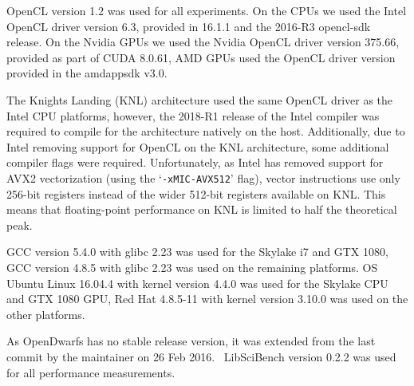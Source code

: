 \documentclass[../document.tex]{subfiles}
\begin{document}
\label{ssec:software}

OpenCL version 1.2 was used for all experiments.
On the CPUs we used the Intel OpenCL driver version 6.3, provided in 16.1.1 and the 2016-R3 opencl-sdk release.
On the Nvidia GPUs we used the Nvidia OpenCL driver version 375.66, provided as part of CUDA 8.0.61, AMD GPUs used the OpenCL driver version provided in the amdappsdk v3.0.

The Knights Landing (KNL) architecture used the same OpenCL driver as the Intel CPU platforms, however, the 2018-R1 release of the Intel compiler was required to compile for the architecture natively on the host.
Additionally, due to Intel removing support for OpenCL on the KNL architecture, some additional compiler flags were required.
Unfortunately, as Intel has removed support for AVX2 vectorization (using the `{\tt -xMIC-AVX512}' flag), vector instructions use only 256-bit registers instead of the wider 512-bit registers available on KNL.
This means that floating-point performance on KNL is limited to half the theoretical peak.

GCC version 5.4.0 with glibc 2.23 was used for the Skylake i7 and GTX 1080,  
GCC version 4.8.5 with glibc 2.23 was used on the remaining platforms.
OS Ubuntu Linux 16.04.4 with kernel version 4.4.0 was used for the Skylake CPU and GTX 1080 GPU, Red Hat 4.8.5-11 with kernel version 3.10.0 was used on the other platforms.

As OpenDwarfs has no stable release version, it was extended from the last commit by the maintainer on 26 Feb 2016.~\cite{opendwarfs2017base}
LibSciBench version 0.2.2 was used for all performance measurements.
\end{document}
